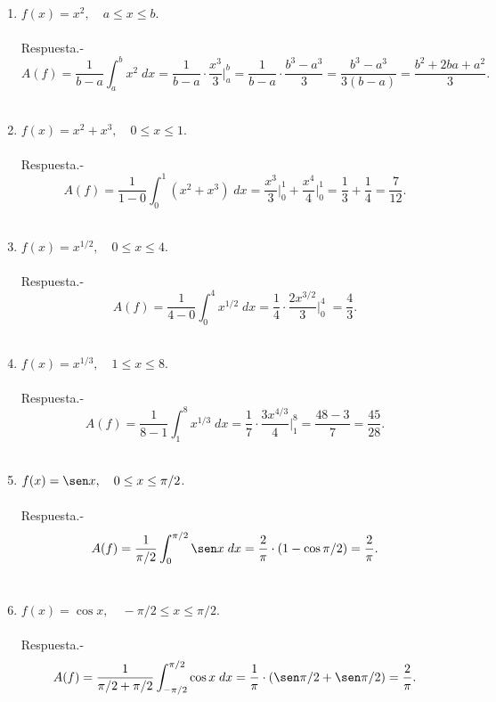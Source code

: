 \begin{enumerate}[\bfseries 1.]

\item $f(x)=x^2,\quad a\leq x \leq b.$\\\\
    Respuesta.-\; $$A(f) = \dfrac{1}{b-a}\int_a^b x^2\; dx = \dfrac{1}{b-a} \cdot \dfrac{x^3}{3}\bigg|_a^b = \dfrac{1}{b-a}\cdot \dfrac{b^3 - a^3}{3}=\dfrac{b^3 - a^3}{3(b-a)} = \dfrac{b^2+2ba+a^2}{3}.$$\\

\item $f(x)=x^2+x^3, \quad 0\leq x \leq 1.$\\\\
    Respuesta.-\; $$A(f) = \dfrac{1}{1-0}\int_0^1 (x^2+x^3)\; dx = \dfrac{x^3}{3}\bigg|_0^1 + \dfrac{x^4}{4}\bigg|_0^1 = \dfrac{1}{3} + \dfrac{1}{4} = \dfrac{7}{12}.$$\\

\item $f(x)=x^{1/2},\quad 0\leq x \leq 4.$\\\\
    Respuesta.-\; $$A(f)=\dfrac{1}{4-0}\int_0^4 x^{1/2}\; dx = \dfrac{1}{4}\cdot \dfrac{2x^{3/2}}{3}\bigg|_0^4\; = \dfrac{4}{3}.$$\\

\item $f(x)=x^{1/3},\quad 1\leq x \leq 8.$\\\\
    Respuesta.-\; $$A(f) = \dfrac{1}{8-1}\int_1^8 x^{1/3}\; dx = \dfrac{1}{7}\cdot \dfrac{3x^{4/3}}{4}\bigg|_1^8 = \dfrac{48-3}{7} = \dfrac{45}{28}.$$\\ 

\item $f(x)=\sen x,\quad 0\leq x \leq \pi/2$.\\\\
    Respuesta.-\; $$A(f)=\dfrac{1}{\pi/2}\int_0^{\pi/2} \sen x\; dx = \dfrac{2}{\pi}\cdot (1-\cos \pi/2) = \dfrac{2}{\pi}.$$\\

\item $f(x)=\cos x,\quad -\pi/2\leq x \leq \pi/2.$\\\\
    Respuesta.-\; $$A(f)=\dfrac{1}{\pi/2 + \pi/2}\int_{-\pi/2}^{\pi/2} \cos x\; dx = \dfrac{1}{\pi}\cdot (\sen \pi/2 + \sen \pi/2) = \dfrac{2}{\pi}.$$\\


\end{enumerate}
